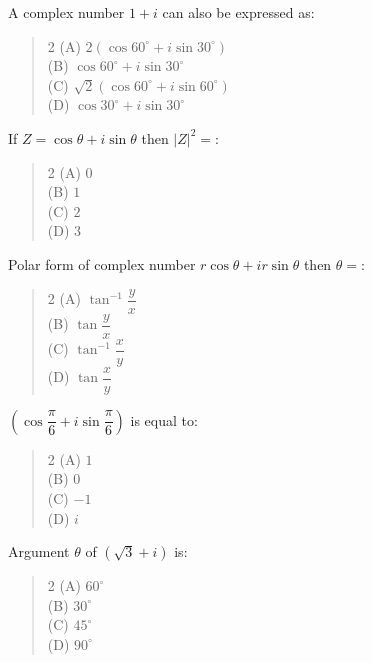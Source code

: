 \documentclass[11pt,a4paper]{article}
\begin{document}
\begin{mcqlist}
\item A complex number $1+i$ can also be expressed as:
\begin{quote}\begin{multicols}{2}
\noindent (A) $2(\cos60^\circ+i\sin30^\circ)$ \\
(B) $\cos60^\circ+i\sin30^\circ$ \\
(C) $\sqrt2(\cos60^\circ+i\sin60^\circ)$ \\
(D) $\cos30^\circ+i\sin30^\circ$
\end{multicols}\end{quote}

\item If $Z=\cos\theta+i\sin\theta$ then $|Z|^2=$:
\begin{quote}\begin{multicols}{2}
\noindent (A) $0$ \\
(B) $1$ \\
(C) $2$ \\
(D) $3$
\end{multicols}\end{quote}

\item Polar form of complex number $r\cos\theta+ir\sin\theta$ then $\theta=$:
\begin{quote}\begin{multicols}{2}
\noindent (A) $\tan^{-1}\dfrac{y}{x}$ \\
(B) $\tan\dfrac{y}{x}$ \\
(C) $\tan^{-1}\dfrac{x}{y}$ \\
(D) $\tan\dfrac{x}{y}$
\end{multicols}\end{quote}

\item $\left(\cos\dfrac{\pi}{6}+i\sin\dfrac{\pi}{6}\right)$ is equal to:
\begin{quote}\begin{multicols}{2}
\noindent (A) $1$ \\
(B) $0$ \\
(C) $-1$ \\
(D) $i$
\end{multicols}\end{quote}

\item Argument $\theta$ of $(\sqrt3+i)$ is:
\begin{quote}\begin{multicols}{2}
\noindent (A) $60^\circ$ \\
(B) $30^\circ$ \\
(C) $45^\circ$ \\
(D) $90^\circ$
\end{multicols}\end{quote}


\end{mcqlist}
\end{document}
